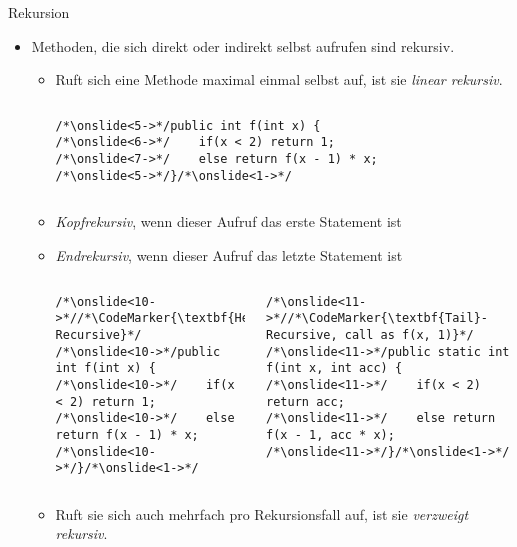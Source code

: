 {\begin{frame}[fragile,c]{Rekursion}
%
\begin{itemize}[<+(1)->]
\itemsep8pt
    \item<2-> Methoden, die sich direkt oder indirekt selbst aufrufen sind rekursiv.
    \begin{itemize}
        \itemsep1.5pt
        \item<3-> Ruft sich eine Methode maximal einmal selbst auf, ist sie \textit{linear rekursiv}.
\begin{columns}[c]
\begin{verbatim}
/*\onslide<5->*/public int f(int x) {
/*\onslide<6->*/    if(x < 2) return 1;
/*\onslide<7->*/    else return f(x - 1) * x;
/*\onslide<5->*/}/*\onslide<1->*/
\end{verbatim}
\end{columns}
        \item<8-> \textit{Kopfrekursiv}, wenn dieser Aufruf das erste Statement ist 
        \item<9-> \textit{Endrekursiv}, wenn dieser Aufruf das letzte Statement ist \vspace*{-\medskipamount}
\begin{columns}[c]
\begin{verbatim}
/*\onslide<10->*//*\CodeMarker{\textbf{Head}-Recursive}*/
/*\onslide<10->*/public int f(int x) {
/*\onslide<10->*/    if(x < 2) return 1;
/*\onslide<10->*/    else return f(x - 1) * x;
/*\onslide<10->*/}/*\onslide<1->*/
\end{verbatim}
\begin{verbatim}
/*\onslide<11->*//*\CodeMarker{\textbf{Tail}-Recursive, call as f(x, 1)}*/
/*\onslide<11->*/public static int f(int x, int acc) {
/*\onslide<11->*/    if(x < 2) return acc;
/*\onslide<11->*/    else return f(x - 1, acc * x);
/*\onslide<11->*/}/*\onslide<1->*/
\end{verbatim}
\end{columns}\vspace*{-\smallskipamount}
        \item<12-> Ruft sie sich auch mehrfach pro Rekursionsfall auf, ist sie \textit{verzweigt rekursiv}.
    \end{itemize}
\end{itemize}
\end{frame}

}
